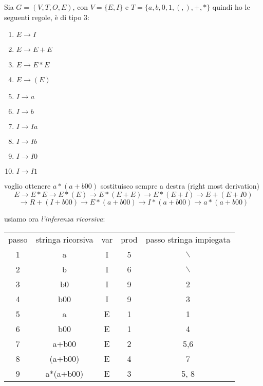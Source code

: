 \begin{example}
	Sia $G=(V,T,O,E)$, con $V=\{E,I\}$ e $T=\{a,b,0,1,(,),+,*\}$
	quindi ho le seguenti regole, è di tipo 3:
	\begin{enumerate}
		\item $E\to I$
		\item $E\to E+E$
		\item $E\to E*E$
		\item $E\to (E)$
		\item $I\to a$
		\item $I\to b$
		\item $I\to Ia$
		\item $I\to Ib$
		\item $I\to I0$
		\item $I\to I1$
	\end{enumerate}
	voglio ottenere $a*(a+b00)$
	sostituisco sempre a destra (right most derivation)
	$$E\to E*E\to E*(E)\to E*(E+E)\to E*(E+I)\to E+(E+I0)$$
	$$\to R+(I+b00)\to E*(a+b00)\to I*(a+b00)\to a*(a+b00)$$

	usiamo ora \textit{l'inferenza ricorsiva}:
	\begin{center}
		\begin{tabular}{|c|c|c|c|c|}
			\hline
			passo & stringa ricorsiva & var & prod & passo stringa impiegata \\
			1     & a                 & I   & 5    & $\backslash$            \\
			\hline
			2     & b                 & I   & 6    & $\backslash$            \\
			\hline
			3     & b0                & I   & 9    & 2                       \\
			\hline
			4     & b00               & I   & 9    & 3                       \\
			\hline
			5     & a                 & E   & 1    & 1                       \\
			\hline
			6     & b00               & E   & 1    & 4                       \\
			\hline
			7     & a+b00             & E   & 2    & 5,6                     \\
			\hline
			8     & (a+b00)           & E   & 4    & 7                       \\
			\hline
			9     & a*(a+b00)         & E   & 3    & 5, 8                    \\
			\hline
		\end{tabular}
	\end{center}
\end{example}
